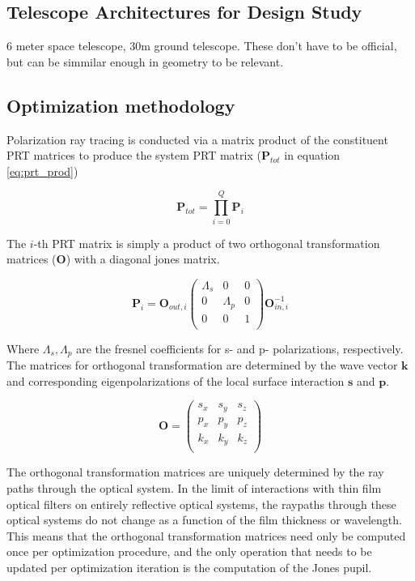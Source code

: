 \subsection{Telescope Architectures for Design Study}
6 meter space telescope, 30m ground telescope. These don't have to be official, but can be simmilar enough in geometry to be relevant.

\subsection{Optimization methodology}
Polarization ray tracing is conducted via a matrix product of the constituent PRT matrices to produce the system PRT matrix ($\mathbf{P}_{tot}$ in equation \ref{eq:prt_prod})

\begin{equation}
    \mathbf{P}_{tot} = \prod_{i=0}^{Q} \mathbf{P}_{i}
    \label{eq:prt_prod}
\end{equation}

The $i$-th PRT matrix is simply a product of two orthogonal transformation matrices ($\mathbf{O}$) with a diagonal jones matrix.

\begin{equation}
    \mathbf{P}_{i} = \mathbf{O}_{out,i} 
    \begin{pmatrix}
        \Lambda_{s} & 0 & 0 \\
        0 & \Lambda_{p} & 0 \\
        0 & 0 & 1 \\
    \end{pmatrix}
    \mathbf{O}_{in,i}^{-1}
\end{equation}

Where $\Lambda_{s},\Lambda_{p}$ are the fresnel coefficients for s- and p- polarizations, respectively. The matrices for orthogonal transformation are determined by the wave vector $\mathbf{k}$ and corresponding eigenpolarizations of the local surface interaction $\mathbf{s}$ and $\mathbf{p}$.

\begin{equation}
    \mathbf{O} = 
    \begin{pmatrix}
        s_{x} & s_{y} & s_{z} \\
        p_{x} & p_{y} & p_{z} \\
        k_{x} & k_{y} & k_{z} \\
    \end{pmatrix}
\end{equation}

The orthogonal transformation matrices are uniquely determined by the ray paths through the optical system. In the limit of interactions with thin film optical filters on entirely reflective optical systems, the raypaths through these optical systems do not change as a function of the film thickness or wavelength. This means that the orthogonal transformation matrices need only be computed once per optimization procedure, and the only operation that needs to be updated per optimization iteration is the computation of the Jones pupil.

